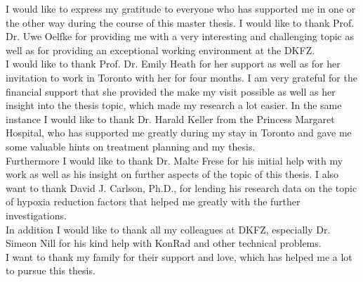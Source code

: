 %
I would like to express my gratitude to everyone who has supported me in one or the other way during the course of this master thesis. I would like to thank Prof. Dr. Uwe Oelfke for providing me with a very interesting and challenging topic as well as for providing an exceptional working environment at the DKFZ.\\I would like to thank Prof. Dr. Emily Heath for her support as well as for her invitation to work in Toronto with her for four months. I am very grateful for the financial support that she provided the make my visit possible as well as her insight into the thesis topic, which made my research a lot easier. In the same instance I would like to thank Dr. Harald Keller from the Princess Margaret Hospital, who has supported me greatly during my stay in Toronto and gave me some valuable hints on treatment planning and my thesis.\\Furthermore I would like to thank Dr. Malte Frese for his initial help with my work as well as his insight on further aspects of the topic of this thesis. I also want to thank David J. Carlson, Ph.D., for lending his research data on the topic of hypoxia reduction factors that helped me greatly with the further investigations.\\In addition I would like to thank all my colleagues at DKFZ, especially Dr. Simeon Nill for his kind help with KonRad and other technical problems.\\I want to thank my family for their support and love, which has helped me a lot to pursue this thesis.